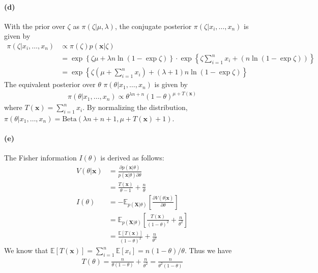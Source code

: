 \paragraph{(d)}
With the prior over $\zeta$ as $\pi(\zeta \vert \mu, \lambda)$, the conjugate posterior $\pi(\zeta \vert x_i, \dots, x_n)$ is given by
\begin{align*}
    \pi(\zeta \vert x_i, \dots, x_n) 
    &\propto \pi(\zeta) p(\bm{x} \vert \zeta) \\
    &=\exp \left\{ \zeta\mu + \lambda n\ln (1 - \exp \zeta) \right\} \cdot
        \exp \left \{\zeta \sum_{i=1}^{n} x_i + \left( n\ln (1 - \exp \zeta) \right) \right\}\\
    &= \exp \left\{ \zeta \left(\mu + \sum_{i=1}^{n}x_i \right) + (\lambda + 1)n\ln (1 - \exp \zeta)
        \right\}
\end{align*}
The equivalent posterior over $\theta$ $\pi(\theta \vert x_1, \dots, x_n)$ is given by
\begin{align*}
    \pi(\theta \vert x_1, \dots, x_n)
    \propto \theta^{\lambda n + n} (1-\theta)^{\mu + T(\bm{x})}
\end{align*}
where $T(\bm{x}) = \sum_{i=1}^{n} x_i$. By normalizing the distribution, $\pi(\theta \vert x_1, \dots, x_n) = \mathrm{Beta}(\lambda n+n+1, \mu+T(\bm{x})+1)$.

\paragraph{(e)}
The Fisher information $I(\theta)$ is derived as follows:
\begin{align*}
    V(\theta \vert \bm{x})
    &= \frac{\partial p(\bm{x} \vert \theta)}{p(\bm{x} \vert \theta) \partial \theta}\\
    &=\frac{T(\bm{x})}{\theta - 1} + \frac{n}{\theta} \\
    I(\theta) 
    &= -\mathbb{E}_{p(\bm{X} \vert \theta)} \left[ \frac{\partial V(\theta \vert \bm{x})}{\partial \theta}\right]\\
    &= \mathbb{E}_{p(\bm{X} \vert \theta)} \left[ \frac{T(\bm{x})}{(1-\theta)^2} + \frac{n}{\theta^2}\right] \\
    &= \frac{\mathbb{E}[T(\bm{x})]}{(1-\theta)^2} + \frac{n}{\theta^2}
\end{align*}
We know that $\mathbb{E}[T(\bm{x})] = \sum_{i=1}^{n} \mathbb{E} [x_i] = n(1-\theta)/\theta$. Thus we have
\begin{align*}
    T(\theta) = \frac{n}{\theta (1-\theta)} + \frac{n}{\theta^2} = \frac{n}{\theta^2(1-\theta)}
\end{align*}

